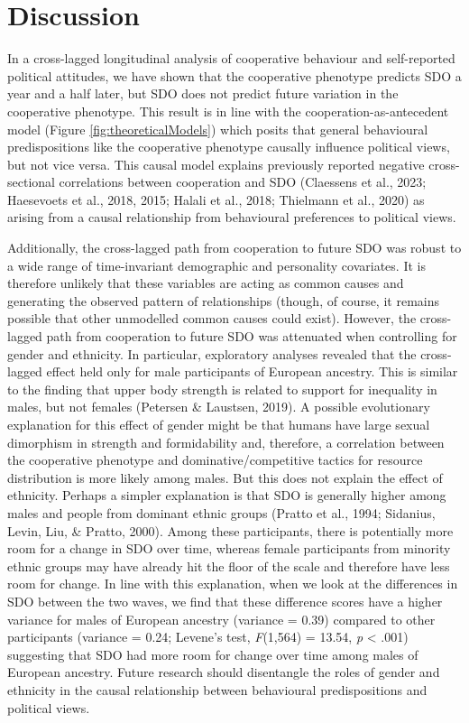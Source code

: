 \documentclass[
  man,floatsintext]{apa6}
\begin{document}
\hypertarget{discussion}{%
\section{Discussion}\label{discussion}}

In a cross-lagged longitudinal analysis of cooperative behaviour and
self-reported political attitudes, we have shown that the cooperative phenotype
predicts SDO a year and a half later, but SDO does not predict future variation
in the cooperative phenotype. This result is in line with the
cooperation-as-antecedent model (Figure \ref{fig:theoreticalModels}) which
posits that general behavioural predispositions like the cooperative phenotype
causally influence political views, but not vice versa. This causal model
explains previously reported negative cross-sectional correlations between
cooperation and SDO (Claessens et al., 2023; Haesevoets et al., 2018, 2015; Halali et al., 2018; Thielmann et al., 2020) as arising from a causal relationship from
behavioural preferences to political views.

Additionally, the cross-lagged path from cooperation to future SDO was robust
to a wide range of time-invariant demographic and personality covariates. It is
therefore unlikely that these variables are acting as common causes and
generating the observed pattern of relationships (though, of course, it remains
possible that other unmodelled common causes could exist). However, the
cross-lagged path from cooperation to future SDO was attenuated when controlling
for gender and ethnicity. In particular, exploratory analyses revealed that the
cross-lagged effect held only for male participants of European ancestry. This
is similar to the finding that upper body strength is related to support for
inequality in males, but not females (Petersen \& Laustsen, 2019). A possible evolutionary
explanation for this effect of gender might be that humans have large sexual
dimorphism in strength and formidability and, therefore, a correlation between
the cooperative phenotype and dominative/competitive tactics for resource
distribution is more likely among males. But this does not explain the effect of
ethnicity. Perhaps a simpler explanation is that SDO is generally higher among
males and people from dominant ethnic groups (Pratto et al., 1994; Sidanius, Levin, Liu, \& Pratto, 2000). Among
these participants, there is potentially more room for a change in SDO over
time, whereas female participants from minority ethnic groups may have already
hit the floor of the scale and therefore have less room for change. In line with
this explanation, when we look at the differences in SDO between the two waves,
we find that these difference scores have a higher variance for males of
European ancestry (variance = 0.39) compared to other
participants (variance = 0.24; Levene's test,
\emph{F}(1,564) = 13.54,
\emph{p} \textless{} .001) suggesting that SDO had more room for
change over time among males of European ancestry. Future research should
disentangle the roles of gender and ethnicity in the causal relationship
between behavioural predispositions and political views.
\end{document}
